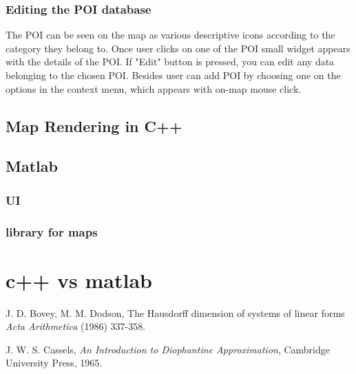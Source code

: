 \documentclass[reqno,openany,12pt]{amsbook}
\theoremstyle{definition}
\theoremstyle{remark}
\begin{document}
\subsection{Editing the POI database}

The POI can be seen on the map as various descriptive icons according to the category they belong to. Once user clicks on one of the POI small widget appears with the details of the POI. If "Edit" button is pressed, you can edit any data belonging to the chosen POI. Besides user can add POI by choosing one on the options in the context menu, which appears with on-map mouse click. 
\section{Map Rendering in C++}
\section{Matlab}
\subsection{UI}
\subsection{library for maps}
\chapter{c++ vs matlab}




\begin{thebibliography}{99}

J. D. Bovey, M. M. Dodson,
The Hausdorff dimension of systems of linear forms
{\em Acta Arithmetica}
(1986) 337-358.

J. W. S. Cassels,
{\em An Introduction to Diophantine Approximation},
Cambridge University Press, 1965.



\end{thebibliography}
\end{document}
